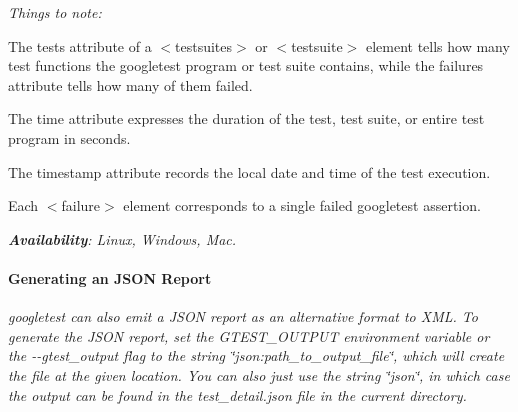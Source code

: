 {\begin{DoxyCode}{0}
\DoxyCodeLine{    </\textcolor{keywordtype}{testcase}>}
\DoxyCodeLine{  </\textcolor{keywordtype}{testsuite}>}
\DoxyCodeLine{  <\textcolor{keywordtype}{testsuite} \textcolor{keyword}{name}=\textcolor{stringliteral}{"LogicTest"} \textcolor{keyword}{tests}=\textcolor{stringliteral}{"1"} \textcolor{keyword}{failures}=\textcolor{stringliteral}{"0"} \textcolor{keyword}{errors}=\textcolor{stringliteral}{"0"} \textcolor{keyword}{time}=\textcolor{stringliteral}{"0.005"}>}
\DoxyCodeLine{    <\textcolor{keywordtype}{testcase} \textcolor{keyword}{name}=\textcolor{stringliteral}{"NonContradiction"} \textcolor{keyword}{status}=\textcolor{stringliteral}{"run"} \textcolor{keyword}{time}=\textcolor{stringliteral}{"0.005"} \textcolor{keyword}{classname}=\textcolor{stringliteral}{""}>}
\DoxyCodeLine{    </\textcolor{keywordtype}{testcase}>}
\DoxyCodeLine{  </\textcolor{keywordtype}{testsuite}>}
\DoxyCodeLine{</\textcolor{keywordtype}{testsuites}>}
\end{DoxyCode}
}

{\itshape Things to note\+:}

{\itshape 
\begin{DoxyItemize}
\item The {\ttfamily tests} attribute of a {\ttfamily $<$testsuites$>$} or {\ttfamily $<$testsuite$>$} element tells how many test functions the googletest program or test suite contains, while the {\ttfamily failures} attribute tells how many of them failed.
\item The {\ttfamily time} attribute expresses the duration of the test, test suite, or entire test program in seconds.
\item The {\ttfamily timestamp} attribute records the local date and time of the test execution.
\item Each {\ttfamily $<$failure$>$} element corresponds to a single failed googletest assertion.
\end{DoxyItemize}}

{\itshape {\bfseries{Availability}}\+: Linux, Windows, Mac.}

{\itshape \paragraph*{Generating an J\+S\+ON Report}}

{\itshape }

{\itshape googletest can also emit a J\+S\+ON report as an alternative format to X\+ML. To generate the J\+S\+ON report, set the {\ttfamily G\+T\+E\+S\+T\+\_\+\+O\+U\+T\+P\+UT} environment variable or the {\ttfamily -\/-\/gtest\+\_\+output} flag to the string {\ttfamily \char`\"{}json\+:path\+\_\+to\+\_\+output\+\_\+file\char`\"{}}, which will create the file at the given location. You can also just use the string {\ttfamily \char`\"{}json\char`\"{}}, in which case the output can be found in the {\ttfamily test\+\_\+detail.\+json} file in the current directory.}

